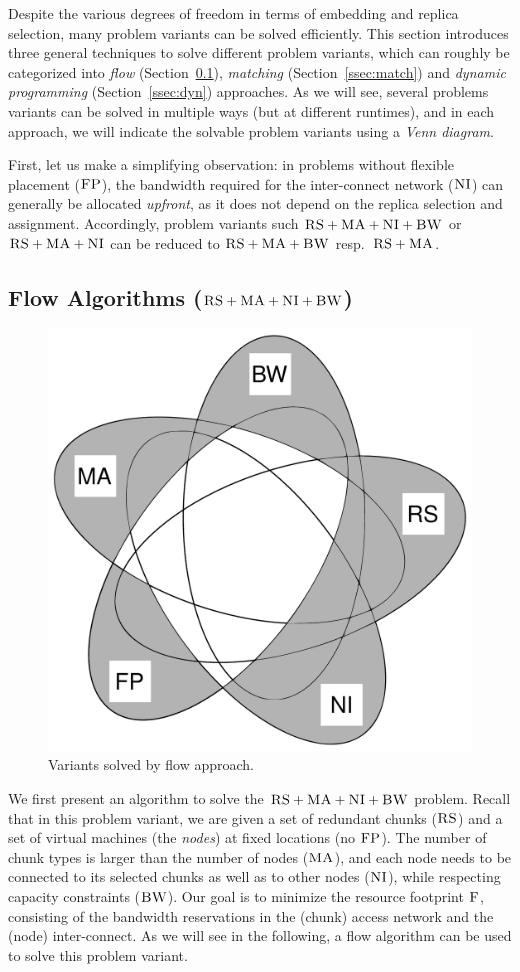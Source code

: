 \documentclass[9pt]{sigcomm-alternate}
\newcommand{\CC}{\textsc{NI}}
\newcommand{\FP}{\textsc{FP}}
\newcommand{\RS}{\textsc{RS}}
\newcommand{\BW}{\textsc{BW}}
\newcommand{\MA}{\textsc{MA}}
\newcommand{\Cost}{\textsc{F}}
\begin{document}
Despite the various degrees of freedom in terms of embedding and replica selection,
 many problem variants can be solved efficiently.
 This section introduces three general techniques to solve different problem variants,
 which can roughly be categorized into
 \emph{flow} (Section~\ref{ssec:flow}), \emph{matching} (Section~\ref{ssec:match}) and \emph{dynamic programming}
 (Section~\ref{ssec:dyn}) approaches.
 As we will see, several problems variants can be solved in multiple ways (but at different runtimes),
 and in each approach, we will indicate the solvable problem variants using a \emph{Venn diagram}.

First, let us make a simplifying observation:
in problems without flexible placement ($\FP$),
the bandwidth required
for the inter-connect network ($\CC$) can generally be allocated \emph{upfront}, as it
does not depend on the replica
selection and assignment.
Accordingly, problem variants such $\RS+\MA+\CC +\BW$ or
$\RS+\MA+\CC$ can be reduced to $\RS+\MA+\BW$ resp.~$\RS + \MA$.

\subsection{Flow Algorithms ($\RS+\MA+\CC+\BW$)}\label{ssec:flow}

\begin{figure}
\includegraphics[width=0.48\columnwidth]{figs/venn_flow.pdf}
\caption{Variants solved by flow approach.}
\label{fig:venn_flow}
\end{figure}

We first present an algorithm to solve the $\RS+\MA+\CC+\BW$ problem.
Recall that in this problem variant,
we are given a set of redundant chunks ($\RS$) and a set of virtual machines
(the \emph{nodes})
at fixed locations (no $\FP$). The number of chunk types is larger than the number
of nodes ($\MA$), and each node needs to be connected
to its selected chunks as well as to other nodes ($\CC$), while respecting
capacity constraints ($\BW$).
Our goal is to minimize the resource footprint $\Cost$, consisting
of the bandwidth reservations in the (chunk) access network and the (node)
inter-connect.
As we will see in the following, a flow algorithm can be used to solve this
problem variant.
\end{document}
